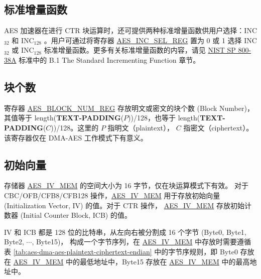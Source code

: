 \documentclass[main\_\_CN.tex]{subfiles}
\begin{document}
\subsection{标准增量函数}\label{sec:aes-Standard-Incrementing-Function}

AES 加速器在进行 CTR 块运算时，还可提供两种标准增量函数供用户选择：INC$_{32}$ 和 INC$_{128}$ 。用户可通过将寄存器 \hyperref[regdesc:AESINCSELREG]{AES\_INC\_SEL\_REG} 置为 0 或 1 选择 INC$_{32}$ 或 INC$_{128}$ 标准增量函数。更多有关标准增量函数的内容，请见 \href{https://nvlpubs.nist.gov/nistpubs/Legacy/SP/nistspecialpublication800-38a.pdf}{NIST SP 800-38A} 标准中的 B.1 The Standard Incrementing Function 章节。

\subsection{块个数}\label{sec:aes-block-number}

寄存器 \hyperref[regdesc:AESBLOCKNUMREG]{AES\_BLOCK\_NUM\_REG} 存放明文或密文的块个数 (Block Number)，其值等于 length({\bfseries TEXT-PADDING}($P$))/128，也等于 length({\bfseries TEXT-PADDING}($C$))/128。这里的 $P$ 指明文（plaintext）， $C$ 指密文（ciphertext）。该寄存器仅在 DMA-AES 工作模式下有意义。

\subsection{初始向量}\label{sec:aes-init-vector}

\label{memdesc:AESIVMEM}存储器 \hyperref[memdesc:AESIVMEM]{AES\_IV\_MEM} 的空间大小为 16 字节，仅在块运算模式下有效。
对于 CBC/OFB/CFB8/CFB128 操作，\hyperref[memdesc:AESIVMEM]{AES\_IV\_MEM} 用于存放初始向量 (Initialization Vector, IV) 的值。对于 CTR 操作， \hyperref[memdesc:AESIVMEM]{AES\_IV\_MEM}  存放初始计数器 (Initial Counter Block, ICB) 的值。

IV 和 ICB 都是 128 位的比特串，从左向右被分割成 16 个字节 (Byte0, Byte1, Byte2, \begin{math}\cdots\end{math}, Byte15)， 构成一个字节序列，在 \hyperref[memdesc:AESIVMEM]{AES\_IV\_MEM} 中存放时需要遵循表 \ref{tab:aes-dma-aes-plaintext-ciphertext-endian} 中的字节序规则，即 Byte0 存放在 \hyperref[memdesc:AESIVMEM]{AES\_IV\_MEM} 中的最低地址中，Byte15 存放在 \hyperref[memdesc:AESIVMEM]{AES\_IV\_MEM} 中的最高地址中。
\end{document}
